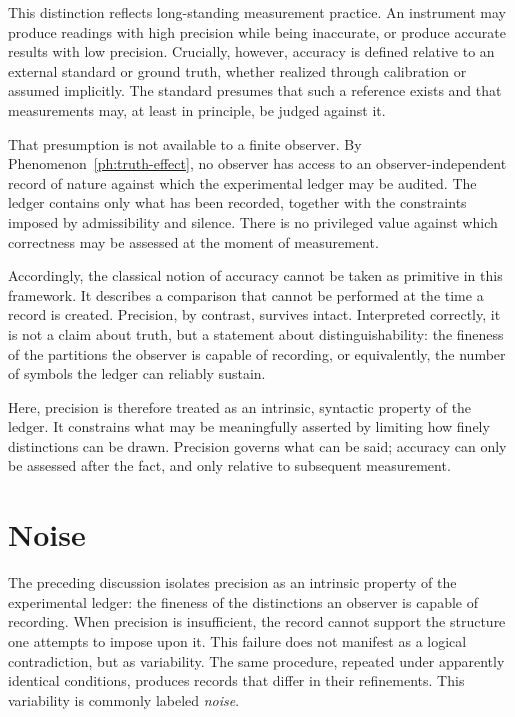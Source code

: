 This distinction reflects long-standing measurement practice. An instrument may
produce readings with high precision while being inaccurate, or produce accurate
results with low precision. Crucially, however, accuracy is defined relative to
an external standard or ground truth, whether realized through calibration or
assumed implicitly. The standard presumes that such a reference exists and that
measurements may, at least in principle, be judged against it.

That presumption is not available to a finite observer. By 
Phenomenon~\ref{ph:truth-effect}, no observer has access to an
observer-independent record of nature against which the experimental ledger may
be audited. The ledger contains only what has been recorded, together with the
constraints imposed by admissibility and silence. There is no privileged value
against which correctness may be assessed at the moment of measurement.

Accordingly, the classical notion of accuracy cannot be taken as primitive in
this framework. It describes a comparison that cannot be performed at the time
a record is created. Precision, by contrast, survives intact. Interpreted
correctly, it is not a claim about truth, but a statement about distinguishability:
the fineness of the partitions the observer is capable of recording, or
equivalently, the number of symbols the ledger can reliably sustain.

Here, precision is therefore treated as an intrinsic, syntactic property
of the ledger. It constrains what may be meaningfully asserted by limiting how
finely distinctions can be drawn.  Precision governs what can be said;
accuracy can only be assessed after the fact, and only relative to subsequent
measurement.

\section{Noise}

The preceding discussion isolates precision as an intrinsic property of the
experimental ledger: the fineness of the distinctions an observer is capable of
recording. When precision is insufficient, the record cannot support the
structure one attempts to impose upon it. This failure does not manifest as a
logical contradiction, but as variability. The same procedure, repeated under
apparently identical conditions, produces records that differ in their
refinements. This variability is commonly labeled \emph{noise}.

